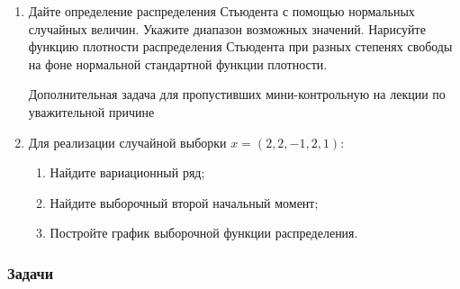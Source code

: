 \begin{enumerate}
\item Дайте определение распределения Стьюдента с помощью нормальных
случайных величин. Укажите диапазон возможных значений. Нарисуйте функцию плотности распределения Стьюдента при разных степенях свободы на фоне нормальной стандартной функции плотности.

Дополнительная задача для пропустивших мини-контрольную на лекции по уважительной причине

\item Для реализации случайной выборки $x=(2,2,-1,2,1)$:
\begin{enumerate}
\item Найдите вариационный ряд;
\item Найдите выборочный второй начальный момент;
\item Постройте график выборочной функции распределения.
\end{enumerate}

\end{enumerate}


\subsubsection*{Задачи}



